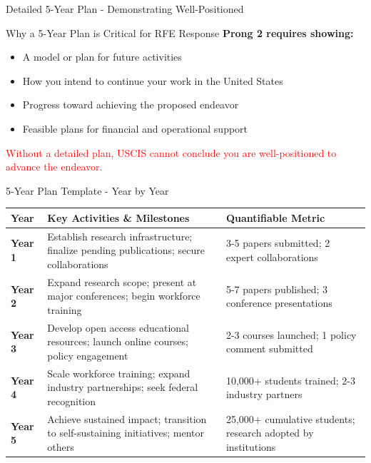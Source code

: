 \documentclass[11pt]{beamer}
\begin{document}
	\begin{frame}{Detailed 5-Year Plan - Demonstrating Well-Positioned}
		\scriptsize
		\begin{block}{Why a 5-Year Plan is Critical for RFE Response}
			\textbf{Prong 2 requires showing:}
			\begin{itemize}
				\item A model or plan for future activities
				\item How you intend to continue your work in the United States
				\item Progress toward achieving the proposed endeavor
				\item Feasible plans for financial and operational support
			\end{itemize}
			\textcolor{red}{Without a detailed plan, USCIS cannot conclude you are well-positioned to advance the endeavor.}
		\end{block}
		
		\begin{block}{5-Year Plan Template - Year by Year}
			\centering
			\begin{tabular}{|p{1.5cm}|p{5.5cm}|p{2cm}|}
				\hline
				\textbf{Year} & \textbf{Key Activities \& Milestones} & \textbf{Quantifiable Metric} \\
				\hline
				\textbf{Year 1} & Establish research infrastructure; finalize pending publications; secure collaborations & 3-5 papers submitted; 2 expert collaborations \\
				\hline
				\textbf{Year 2} & Expand research scope; present at major conferences; begin workforce training & 5-7 papers published; 3 conference presentations \\
				\hline
				\textbf{Year 3} & Develop open access educational resources; launch online courses; policy engagement & 2-3 courses launched; 1 policy comment submitted \\
				\hline
				\textbf{Year 4} & Scale workforce training; expand industry partnerships; seek federal recognition & 10,000+ students trained; 2-3 industry partners \\
				\hline
				\textbf{Year 5} & Achieve sustained impact; transition to self-sustaining initiatives; mentor others & 25,000+ cumulative students; research adopted by institutions \\
				\hline
			\end{tabular}
		\end{block}
	\end{frame}
	
\end{document}
